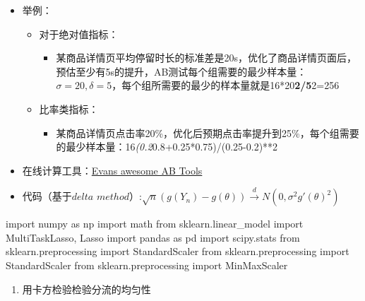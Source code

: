 \documentclass[
  letterpaper,
  DIV=11,
  numbers=noendperiod]{scrreprt}
\newenvironment{Shaded}{\begin{snugshade}}{\end{snugshade}}
\newcommand{\ImportTok}[1]{\textcolor[rgb]{0.00,0.46,0.62}{#1}}
\newcommand{\NormalTok}[1]{\textcolor[rgb]{0.00,0.23,0.31}{#1}}
\providecommand{\tightlist}{%
  \setlength{\itemsep}{0pt}\setlength{\parskip}{0pt}}
\begin{document}
\begin{itemize}
\item
  举例：

  \begin{itemize}
  \item
    对于绝对值指标：

    \begin{itemize}
    \tightlist
    \item
      某商品详情页平均停留时长的标准差是20s，优化了商品详情页面后，预估至少有5s的提升，AB测试每个组需要的最少样本量：\(\sigma = 20,\delta=5\)，每个组所需要的最少的样本量就是16*20\textbf{2/5}2=256
    \end{itemize}
  \item
    比率类指标：

    \begin{itemize}
    \tightlist
    \item
      某商品详情页点击率20\%，优化后预期点击率提升到25\%，每个组需要的最少样本量：16\emph{(0.2}0.8+0.25*0.75)/(0.25-0.2)**2
    \end{itemize}
  \end{itemize}
\item
  在线计算工具：\href{https://www.evanmiller.org/ab-testing/}{Evans
  awesome AB Tools}
\item
  代码（基于\(delta\)
  \(method\)）:\(\sqrt{n}(g(Y_n) - g(\theta)) \xrightarrow{d} N(0, \sigma^2 g'(\theta)^2)\)
\end{itemize}

\begin{Shaded}
\begin{Highlighting}[]
\ImportTok{import}\NormalTok{ numpy }\ImportTok{as}\NormalTok{ np}
\ImportTok{import}\NormalTok{ math}
\ImportTok{from}\NormalTok{ sklearn.linear\_model }\ImportTok{import}\NormalTok{ MultiTaskLasso, Lasso}
\ImportTok{import}\NormalTok{ pandas }\ImportTok{as}\NormalTok{ pd}
\ImportTok{import}\NormalTok{ scipy.stats}
\ImportTok{from}\NormalTok{ sklearn.preprocessing }\ImportTok{import}\NormalTok{ StandardScaler}
\ImportTok{from}\NormalTok{ sklearn.preprocessing }\ImportTok{import}\NormalTok{ StandardScaler}
\ImportTok{from}\NormalTok{ sklearn.preprocessing }\ImportTok{import}\NormalTok{ MinMaxScaler}
\end{Highlighting}
\end{Shaded}

\begin{enumerate}
\def\labelenumi{\arabic{enumi}.}
\tightlist
\item
  用卡方检验检验分流的均匀性
\end{enumerate}
\end{document}
